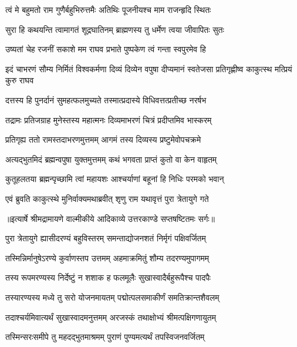 \twolineshloka
{त्वं मे बहुमतो राम गुणैर्बहुभिरुत्तमैः}
{अतिथिः पूजनीयश्च माम राजन्हृदि स्थितः} %

\twolineshloka
{सुरा हि कथयन्ति त्वामागतं शूद्रघातिनम्}
{ब्राह्मणस्य तु धर्मेण त्वया जीवापितः सुतः} %

\twolineshloka
{उष्यतां चेह रजनीं सकाशे मम राघव}
{प्रभाते पुष्पकेण त्वं गन्ता स्वपुरमेव हि} %

\threelineshloka
{इदं चाभरणं सौम्य निर्मितं विश्वकर्मणा}
{दिव्यं दिव्येन वपुषा दीप्यमानं स्वतेजसा}
{प्रतिगृह्णीष्व काकुत्स्थ मत्प्रियं कुरु राघव} %

\twolineshloka
{दत्तस्य हि पुनर्दानं सुमहत्फलमुच्यते}
{तस्मात्प्रदास्ये विधिवत्तत्प्रतीच्छ नरर्षभ} %

\twolineshloka
{तद्रामः प्रतिजग्राह मुनेस्तस्य महात्मनः}
{दिव्यमाभरणं चित्रं प्रदीप्तमिव भास्करम्} %

\twolineshloka
{प्रतिगृह्य ततो रामस्तदाभरणमुत्तमम्}
{आगमं तस्य दिव्यस्य प्रष्टुमेवोपचक्रमे} %

\twolineshloka
{अत्यद्भुतमिदं ब्रह्मन्वपुषा युक्तमुत्तमम्}
{कथं भगवता प्राप्तं कुतो वा केन वाहृतम्} %

\twolineshloka
{कुतूहलतया ब्रह्मन्पृच्छामि त्वां महायशः}
{आश्चर्याणां बहूनां हि निधिः परमको भवान्} %

\twolineshloka
{एवं ब्रुवति काकुत्स्थे मुनिर्वाक्यमथाब्रवीत्}
{शृणु राम यथावृत्तं पुरा त्रेतायुगे गते} %


{॥इत्यार्षे श्रीमद्रामायणे वाल्मीकीये आदिकाव्ये उत्तरकाण्डे सप्तषष्टितमः सर्गः॥}


\twolineshloka
{पुरा त्रेतायुगे ह्यासीदरण्यं बहुविस्तरम्}
{समन्ताद्योजनशतं निर्मृगं पक्षिवर्जितम्} %

\twolineshloka
{तस्मिन्निर्मानुषेऽरण्ये कुर्वाणस्तप उत्तमम्}
{अहमाक्रमितुं शौम्य तदरण्यमुपागमम्} %

\twolineshloka
{तस्य रूपमरण्यस्य निर्देष्टुं न शशाक ह}
{फलमूलैः सुखास्वादैर्बहुरूपैश्च पादपैः} %

\twolineshloka
{तस्यारण्यस्य मध्ये तु सरो योजनमायतम्}
{पद्मोत्पलसमाकीर्णं समतिक्रान्तशैवलम्} %

\twolineshloka
{तदाश्चर्यमिवात्यर्थं सुखास्वादमनुत्तमम्}
{अरजस्कं तथाक्षोभ्यं श्रीमत्पक्षिगणायुतम्} %

\twolineshloka
{तस्मिन्सरःसमीपे तु महदद्भुतमाश्रमम्}
{पुराणं पुण्यमत्यर्थं तपस्विजनवर्जितम्} %

